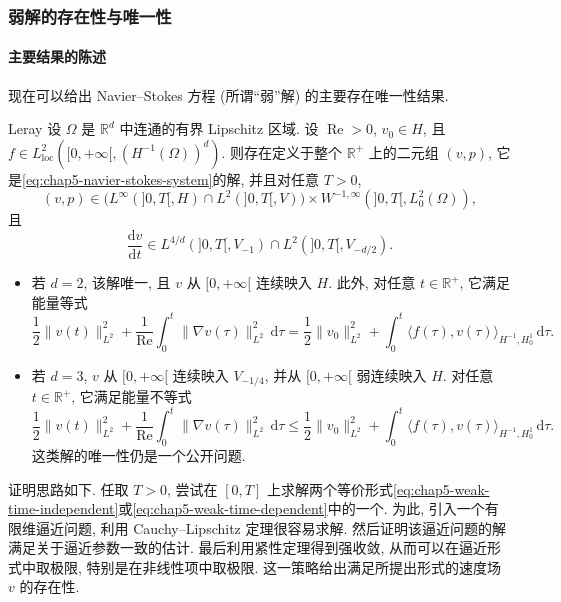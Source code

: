 \subsubsection{弱解的存在性与唯一性}
\label{subsec:chap5-weak-existence-uniqueness}

\paragraph{主要结果的陈述}

现在可以给出 Navier--Stokes 方程 (所谓``弱''解) 的主要存在唯一性结果.

\begin{Theorem}{Leray}
\label{thm:chap5-leray}
设 $\Omega$ 是 $\mathbb R^d$ 中连通的有界 Lipschitz 区域. 设 $\operatorname{Re}>0$, $v_0\in H$, 且 $f\in L_{\mathrm{loc}}^2([0,+\infty[,(H^{-1}(\Omega))^d)$. 则存在定义于整个 $\mathbb R^+$ 上的二元组 $(v,p)$, 它是\eqref{eq:chap5-navier-stokes-system}的解, 并且对任意 $T>0$,
\[
 (v,p)\in\bigl(L^\infty(]0,T[,H)\cap L^2(]0,T[,V)\bigr)
 \times W^{-1,\infty}(]0,T[,L_0^2(\Omega)),
\]
且
\[
 \frac{\mathrm dv}{\mathrm dt}
 \in L^{4/d}(]0,T[,V_{-1})\cap L^2(]0,T[,V_{-d/2}).
\]
\begin{itemize}
 \item 若 $d=2$, 该解唯一, 且 $v$ 从 $[0,+\infty[$ 连续映入 $H$. 此外, 对任意 $t\in\mathbb R^+$, 它满足能量等式
 \begin{equation}
  \frac12\|v(t)\|_{L^2}^2
  +\frac1{\operatorname{Re}}\int_0^t\|\nabla v(\tau)\|_{L^2}^2\,\mathrm d\tau
  =\frac12\|v_0\|_{L^2}^2
  +\int_0^t\langle f(\tau),v(\tau)\rangle_{H^{-1},H_0^1}\,\mathrm d\tau.
  \label{eq:chap5-leray-energy-equality}
 \end{equation}
 \item 若 $d=3$, $v$ 从 $[0,+\infty[$ 连续映入 $V_{-1/4}$, 并从 $[0,+\infty[$ 弱连续映入 $H$. 对任意 $t\in\mathbb R^+$, 它满足能量不等式
 \begin{equation}
  \frac12\|v(t)\|_{L^2}^2
  +\frac1{\operatorname{Re}}\int_0^t\|\nabla v(\tau)\|_{L^2}^2\,\mathrm d\tau
  \leq\frac12\|v_0\|_{L^2}^2
  +\int_0^t\langle f(\tau),v(\tau)\rangle_{H^{-1},H_0^1}\,\mathrm d\tau.
  \label{eq:chap5-leray-energy-inequality}
 \end{equation}
 这类解的唯一性仍是一个公开问题.
\end{itemize}
\end{Theorem}

证明思路如下. 任取 $T>0$, 尝试在 $[0,T]$ 上求解两个等价形式\eqref{eq:chap5-weak-time-independent}或\eqref{eq:chap5-weak-time-dependent}中的一个. 为此, 引入一个有限维逼近问题, 利用 Cauchy--Lipschitz 定理很容易求解. 然后证明该逼近问题的解满足关于逼近参数一致的估计. 最后利用紧性定理得到强收敛, 从而可以在逼近形式中取极限, 特别是在非线性项中取极限. 这一策略给出满足所提出形式的速度场 $v$ 的存在性.

